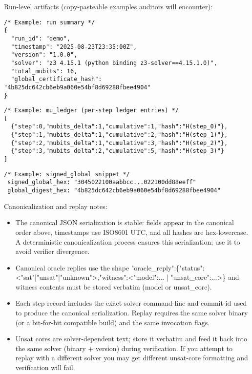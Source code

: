 \documentclass[11pt]{article}
\begin{document}
Run-level artifacts (copy-pasteable examples auditors will encounter):

\begin{verbatim}
/* Example: run summary */
{
  "run_id": "demo",
  "timestamp": "2025-08-23T23:35:00Z",
  "version": "1.0.0",
  "solver": "z3 4.15.1 (python binding z3-solver==4.15.1.0)",
  "total_mubits": 16,
  "global_certificate_hash": "4b825dc642cb6eb9a060e54bf8d69288fbee4904"
}
\end{verbatim}

\begin{verbatim}
/* Example: mu_ledger (per-step ledger entries) */
[
  {"step":0,"mubits_delta":1,"cumulative":1,"hash":"H(step_0)"},
  {"step":1,"mubits_delta":1,"cumulative":2,"hash":"H(step_1)"},
  {"step":2,"mubits_delta":1,"cumulative":3,"hash":"H(step_2)"},
  {"step":3,"mubits_delta":2,"cumulative":5,"hash":"H(step_3)"}
]
\end{verbatim}

\begin{verbatim}
/* Example: signed_global snippet */
 signed_global_hex: "3045022100aabbcc...022100dd88eeff"
 global_digest_hex: "4b825dc642cb6eb9a060e54bf8d69288fbee4904"
\end{verbatim}

Canonicalization and replay notes:
\begin{itemize}
  \item The canonical JSON serialization is stable: fields appear in the canonical order above, timestamps use ISO8601 UTC, and all hashes are hex-lowercase. A deterministic canonicalization process ensures this serialization; use it to avoid verifier divergence.
  \item Canonical oracle replies use the shape "oracle_reply":\{"status":<"sat"|"unsat"|"unknown">,"witness":<{"model":...} | {"unsat_core":...}>\} and witness contents must be stored verbatim (model or unsat_core).
  \item Each step record includes the exact solver command-line and commit-id used to produce the canonical serialization. Replay requires the same solver binary (or a bit-for-bit compatible build) and the same invocation flags.
  \item Unsat cores are solver-dependent text; store it verbatim and feed it back into the same solver (binary + version) during verification. If you attempt to replay with a different solver you may get different unsat-core formatting and verification will fail.
\end{itemize}
\end{document}
